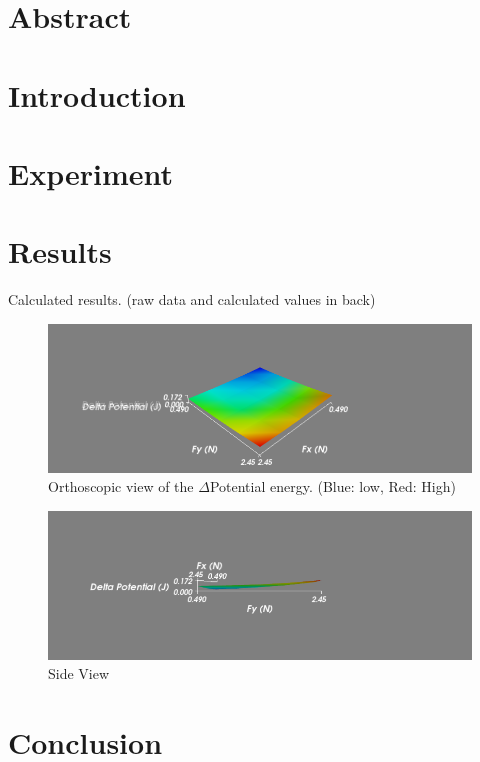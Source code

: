 \documentclass[a4paper,12pt]{article}
\begin{document}
\section*{Abstract}
\section*{Introduction}
\section*{Experiment}
\section*{Results}
Calculated results. (raw data and calculated values in back)\\
\begin{figure}[h]
\centering
\includegraphics[width=5in]{ortho.png}
\caption{Orthoscopic view of the $\Delta$Potential energy. (Blue: low, Red: High)}
\end{figure}
\begin{figure}[h]
\centering
\includegraphics[width=5in]{sideview.png}
\caption{Side View}
\end{figure}
\section*{Conclusion}
\end{document}
